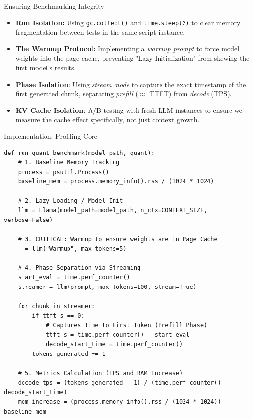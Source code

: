 \documentclass[10pt]{beamer}
\begin{document}
\begin{frame}{Ensuring Benchmarking Integrity}
    \begin{itemize}
        \item \textbf{Run Isolation:} Using \texttt{gc.collect()} and \texttt{time.sleep(2)} to clear memory fragmentation between tests in the same script instance.
        \item \textbf{The Warmup Protocol:} Implementing a \textit{warmup prompt} to force model weights into the page cache, preventing "Lazy Initialization" from skewing the first model's results.
        \item \textbf{Phase Isolation:} Using \textit{stream mode} to capture the exact timestamp of the first generated chunk, separating \textit{prefill} ($\approx$ TTFT) from \textit{decode} (TPS).
        \item \textbf{KV Cache Isolation:} A/B testing with fresh LLM instances to ensure we measure the cache effect specifically, not just context growth.
    \end{itemize}
\end{frame}


\begin{frame}[fragile]{Implementation: Profiling Core}
    \begin{lstlisting}[caption=Quantization Profiling Logic (SNIPPET)]
def run_quant_benchmark(model_path, quant):
    # 1. Baseline Memory Tracking
    process = psutil.Process()
    baseline_mem = process.memory_info().rss / (1024 * 1024)

    # 2. Lazy Loading / Model Init
    llm = Llama(model_path=model_path, n_ctx=CONTEXT_SIZE, verbose=False)
    
    # 3. CRITICAL: Warmup to ensure weights are in Page Cache
    _ = llm("Warmup", max_tokens=5)

    # 4. Phase Separation via Streaming
    start_eval = time.perf_counter()
    streamer = llm(prompt, max_tokens=100, stream=True)

    for chunk in streamer:
        if ttft_s == 0:
            # Captures Time to First Token (Prefill Phase)
            ttft_s = time.perf_counter() - start_eval
            decode_start_time = time.perf_counter()
        tokens_generated += 1

    # 5. Metrics Calculation (TPS and RAM Increase)
    decode_tps = (tokens_generated - 1) / (time.perf_counter() - decode_start_time)
    mem_increase = (process.memory_info().rss / (1024 * 1024)) - baseline_mem
    \end{lstlisting}
\end{frame}
\end{document}
